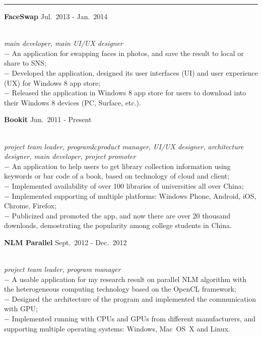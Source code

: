 \documentclass[a4paper,10pt]{article}
\newcommand{\shadedsection}[1]{
    \setlength{\fboxsep}{0pt}
    \colorbox{shadecolor}{%
        \begin{minipage}{\linewidth}%
            \vspace{0.2em}%
            #1%
        \end{minipage}%
    }
}
\newenvironment{rSection}[1]{ %
  \medskip
  \hspace{-1.5em}{\color{Blue}\MakeUppercase{\large \bf {#1}}} %
  \vspace{-0.2em}
  \medskip
  \hrule %
  \begin{list}{}{ %
    \setlength{\leftmargin}{1.5em} %
  }
\setlength{\itemsep}{1pt}
  \item[]
}{
  \end{list}
}
\newcommand{\detail}[1]{{$-$ {#1}}}
\newcommand{\period}[3]{\normalsize {#1} \hfill {#2} - {#3}}
\begin{document}
\begin{rSection}{Main Projects}
  \vspace{-1.5em}
  \item
    \shadedsection{\period{\bf FaceSwap}{Jul.~2013}{Jan.~2014}}\\
    {\em main developer, main UI/UX designer}\\
    \detail{An application for swapping faces in photos, and save the result to local or share to SNS;}\\
    \detail{Developed the application, designed its user interfaces (UI) and user experience (UX) for Windows 8 app store;}\\
    \detail{Released the application in Windows 8 app store for users to download into their Windows 8 devices (PC, Surface, etc.).}
    
  \item
    \shadedsection{\period{\bf Bookit}{Jun.~2011}{Present}}\\
    {\em project team leader, program$\&$product manager, UI/UX designer, architecture designer, main developer, project promoter}\\
    \detail{An application to help users to get library collection information using keywords or bar code of a book, based on technology of cloud and client;}\\
    \detail{Implemented availability of over 100 libraries of universities all over China;}\\
    \detail{Implemented supporting of multiple platforms: Windows Phone, Android, iOS, Chrome, Firefox;}\\
    \detail{Publicized and promoted the app, and now there are over 20 thousand downloads, demostrating the popularity among college students in China.}
    
  \item
    \shadedsection{\period{\bf NLM Parallel}{Sept.~2012}{Dec.~2012}}\\
    {\em project team leader, program manager}\\
    \detail{A usable application for my research result on parallel NLM algorithm with the heterogeneous computing technology based on the OpenCL framework;}\\
    \detail{Designed the architecture of the program and implemented the communication with GPU;}\\
    \detail{Implemented running with CPUs and GPUs from different manufacturers, and supporting multiple operating systems: Windows, Mac~OS~X and Linux.}
    

\end{rSection}
\end{document}
